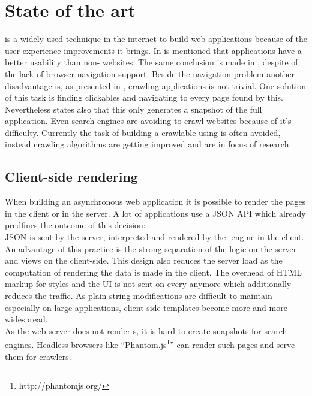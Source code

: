 \section{State of the art\label{chap:state_of_the_art}}
\ajax{} is a widely used technique in the internet to build web applications because of the user experience improvements it brings.
In \cite{roodt2006effect} is mentioned that \ajax{} applications have a better usability than non-\ajax{} websites.
The same conclusion is made in \cite{kluge2007effects}, despite of the lack of browser navigation support.
Beside the navigation problem another disadvantage is, as presented in \cite{mesbah2009analysis}, crawling \ajax{} applications is not trivial.
One solution of this task is finding clickables and navigating to every page found by this.
Nevertheless \cite{mesbah2009analysis} states also that this only generates a snapshot of the full application.
Even search engines are avoiding to crawl websites because of it's difficulty\cite{duda2009ajax}.
Currently the task of building a crawlable \singlePageApplication{} using \ajax{} is often avoided, instead crawling algorithms are getting improved and are in focus of research.

\subsection{Client-side rendering\label{sec:state_client_side_rendering}}
When building an asynchronous web application it is possible to render the pages in the client or in the server.
A lot of \ajax{} applications use a JSON API which already predfines the outcome of this decision:
\\
JSON is sent by the server, interpreted and rendered by the \ajax{}-engine in the client.
An advantage of this practice is the strong separation of the logic on the server and views on the client-side.
This \webApplication{} design also reduces the server load as the computation of rendering the data is made in the client.
The overhead of HTML markup for styles and the UI is not sent on every \webPage{} anymore which additionally reduces the traffic.
As plain string modifications are difficult to maintain especially on large applications, client-side templates become more and more widespread.
\\
As the web server does not render \webPage{}s, it is hard to create snapshots for search engines.
Headless browsers like \enquote{Phantom.js\footnote{http://phantomjs.org/}} can render such pages and serve them for crawlers.

